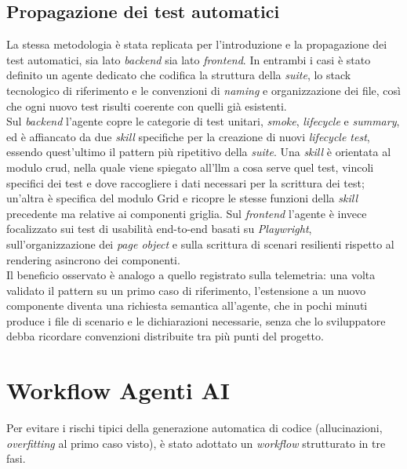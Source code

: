 \subsection{Propagazione dei test automatici}

La stessa metodologia è stata replicata per l'introduzione e la propagazione dei test
automatici, sia lato \emph{backend} sia lato \emph{frontend}. In entrambi i casi è stato
definito un agente dedicato che codifica la struttura della \emph{suite}, lo stack
tecnologico di riferimento e le convenzioni di \emph{naming} e organizzazione dei file,
così che ogni nuovo test risulti coerente con quelli già esistenti.\\
Sul \emph{backend} l'agente copre le categorie di test unitari, \emph{smoke},
\emph{lifecycle} e \emph{summary}, ed è affiancato da due \emph{skill} specifiche per la creazione di
nuovi \emph{lifecycle test}, essendo quest'ultimo il pattern più ripetitivo della \emph{suite}.
Una \emph{skill} è orientata al modulo \gls{crud}, nella quale viene spiegato all'\gls{llm} a cosa serve quel test, vincoli specifici
dei test e dove raccogliere i dati necessari per la scrittura dei test; un'altra è specifica del modulo Grid e
ricopre le stesse funzioni della \emph{skill} precedente ma relative ai componenti griglia.
Sul \emph{frontend} l'agente è invece focalizzato sui test di usabilità
end-to-end basati su \emph{Playwright}, sull'organizzazione dei \emph{page object} e
sulla scrittura di scenari resilienti rispetto al rendering asincrono dei componenti.\\
Il beneficio osservato è analogo a quello registrato sulla telemetria: una volta
validato il pattern su un primo caso di riferimento, l'estensione a un nuovo componente
diventa una richiesta semantica all'agente, che in pochi minuti produce i file di
scenario e le dichiarazioni necessarie, senza che lo sviluppatore debba ricordare
convenzioni distribuite tra più punti del progetto.

\section{Workflow Agenti AI}
\label{sec:workflow-plan}

Per evitare i rischi tipici della generazione automatica di codice (allucinazioni, \emph{overfitting}
al primo caso visto), è stato adottato un \emph{workflow} strutturato in tre fasi.

